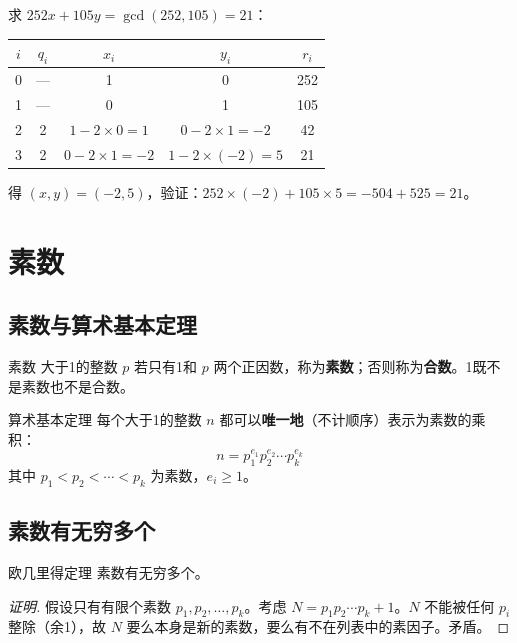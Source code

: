 \begin{example}
求 \(252x+105y=\gcd(252,105)=21\)：

\begin{table}[H]
\centering
\begin{tabular}{ccccc}
\toprule
\(i\) & \(q_i\) & \(x_i\) & \(y_i\) & \(r_i\) \\
\midrule
0 & — & 1 & 0 & 252 \\
1 & — & 0 & 1 & 105 \\
2 & 2 & \(1-2\times0=1\) & \(0-2\times1=-2\) & 42 \\
3 & 2 & \(0-2\times1=-2\) & \(1-2\times(-2)=5\) & 21 \\
\bottomrule
\end{tabular}
\end{table}

得 \((x,y)=(-2,5)\)，验证：\(252\times(-2)+105\times5=-504+525=21\)。
\end{example}

\section{素数}

\subsection{素数与算术基本定理}

\begin{mydefinition}{素数}
大于1的整数 \(p\) 若只有1和 \(p\) 两个正因数，称为\textbf{素数}；否则称为\textbf{合数}。1既不是素数也不是合数。
\end{mydefinition}

\begin{myTheorem}{算术基本定理}
每个大于1的整数 \(n\) 都可以\textbf{唯一地}（不计顺序）表示为素数的乘积：
\[
n = p_1^{e_1} p_2^{e_2} \cdots p_k^{e_k}
\]
其中 \(p_1<p_2<\cdots<p_k\) 为素数，\(e_i\geqslant 1\)。
\end{myTheorem}

\subsection{素数有无穷多个}

\begin{myTheorem}{欧几里得定理}
素数有无穷多个。
\end{myTheorem}

\begin{proof}[证明]
假设只有有限个素数 \(p_1,p_2,\dots,p_k\)。考虑 \(N=p_1p_2\cdots p_k+1\)。\(N\) 不能被任何 \(p_i\) 整除（余1），故 \(N\) 要么本身是新的素数，要么有不在列表中的素因子。矛盾。
\end{proof}

